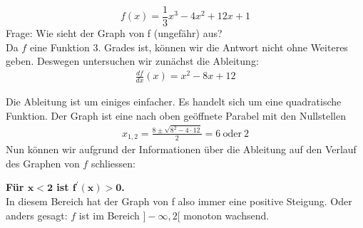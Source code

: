 \begin{examplebreak}
    \[f\left(x\right)=\frac{1}{3}x^3-4x^2+12x+1\] Frage: Wie sieht der Graph von f (ungefähr) aus?\\
    Da $f$ eine Funktion 3. Grades ist, können wir die Antwort nicht ohne Weiteres geben. Deswegen untersuchen wir zunächst die Ableitung:
    \begin{align*}
        \frac{df}{dx}\left(x\right)=x^2-8x+12
    \end{align*}
    \begin{minipage}{0.6\textwidth}
        Die Ableitung ist um einiges einfacher. Es handelt sich um eine quadratische Funktion. Der Graph ist eine nach oben geöffnete Parabel mit den Nullstellen
        \begin{align*}
            x_{1,2}=\frac{8\pm\sqrt{8^2-4\cdot12}}{2}=6\ \text{oder}\ 2
        \end{align*}
        Nun können wir aufgrund der Informationen über die Ableitung auf den Verlauf des Graphen von $f$ schliessen:
    \end{minipage}
    \begin{minipage}{0.4\textwidth}
        \begin{figure}[H]
        \end{figure}
        \vspace{0.3cm}
    \end{minipage}
    \textbf{Für $\boldsymbol{x<2}$ ist $\boldsymbol{f^\prime\left(x\right)>0}$.}\\
    In diesem Bereich hat der Graph von f also immer eine positive Steigung. Oder anders gesagt: $f$ ist im Bereich $]-\infty,2[$  monoton wachsend.\\
    \vspace{0.5cm}


\end{examplebreak}
